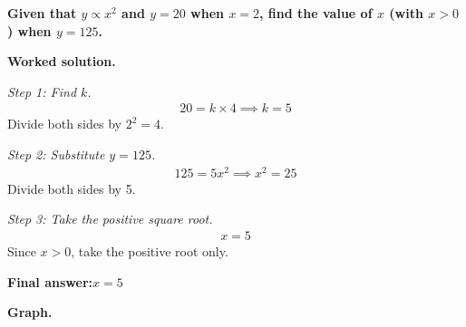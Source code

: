 \documentclass[11pt]{article}
\newcommand{\question}[1]{\par\medskip\noindent\textbf{#1}\par}
\begin{document}
\question{Given that \( y \propto x^2 \) and \( y = 20 \) when \( x = 2 \), find the value of \( x \) (with \( x > 0 \)) when \( y = 125 \).}

\textbf{Worked solution.}

\textit{Step 1: Find \( k \).}
\[\begin{gathered}
20 = k \times 4 \implies k = 5
\end{gathered}\]
Divide both sides by \( 2^2 = 4 \).

\textit{Step 2: Substitute \( y = 125 \).}
\[\begin{gathered}
125 = 5x^2 \implies x^2 = 25
\end{gathered}\]
Divide both sides by 5.

\textit{Step 3: Take the positive square root.}
\[\begin{gathered}
x = 5
\end{gathered}\]
Since \( x > 0 \), take the positive root only.

\begin{answerbox}
\textbf{Final answer:}\quad \(\displaystyle  x = 5 \)
\end{answerbox}
\textbf{Graph.}
\end{document}
